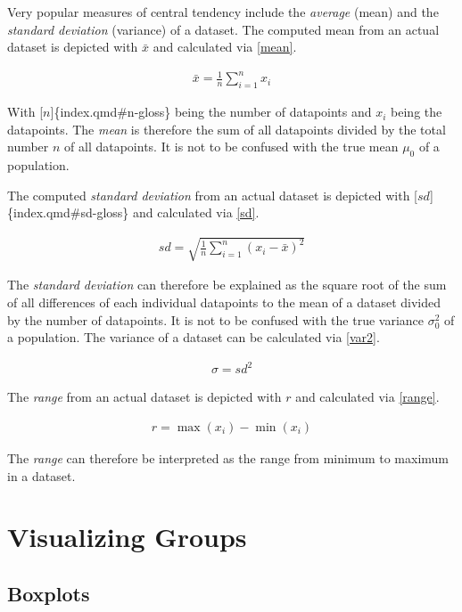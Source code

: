\documentclass[
  a4paper,
]{scrbook}
\begin{document}
Very popular measures of central tendency include the \emph{average}
(mean) and the \emph{standard deviation} (variance) of a dataset. The
computed mean from an actual dataset is depicted with
\hyperref[mean-gloss]{\(\bar{x}\)} and calculated via \eqref{mean}.

\begin{align}
\bar{x} = \frac{1}{n}\sum_{i=1}^{n} x_i \label{mean}
\end{align}

With {[}\(n\){]}\{index.qmd\#n-gloss\} being the number of datapoints
and \hyperref[xi-gloss]{\(x_i\)} being the datapoints. The \emph{mean}
is therefore the sum of all datapoints divided by the total number \(n\)
of all datapoints. It is not to be confused with the true mean
\hyperref[truemean-gloss]{\(\mu_0\)} of a population.

The computed \emph{standard deviation} from an actual dataset is
depicted with {[}\(sd\){]}\{index.qmd\#sd-gloss\} and calculated via
\eqref{sd}.

\begin{align}
sd = \sqrt{\frac{1}{n} \sum_{i=1}^{n} (x_i - \bar{x})^2} \label{sd}
\end{align}

The \emph{standard deviation} can therefore be explained as the square
root of the sum of all differences of each individual datapoints to the
mean of a dataset divided by the number of datapoints. It is not to be
confused with the true variance
\hyperref[truevariance-gloss]{\(\sigma_0^2\)} of a population. The
variance of a dataset can be calculated via \eqref{var2}.

\begin{align}
\sigma = sd^2 \label{var2}
\end{align}

The \emph{range} from an actual dataset is depicted with
\hyperref[range-gloss]{\(r\)} and calculated via \eqref{range}.

\begin{align}
r = \max(x_i) - \min(x_i) \label{range}
\end{align}

The \emph{range} can therefore be interpreted as the range from minimum
to maximum in a dataset.

\section{Visualizing Groups}\label{sec-vis-grps}

\subsection{Boxplots}\label{boxplots}
\end{document}
